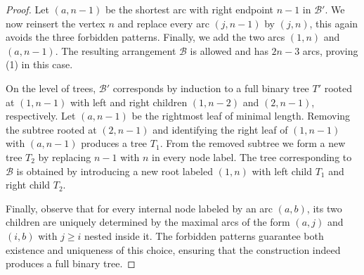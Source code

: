 \documentclass[12pt,a4paper]{amsart}
\theoremstyle{definition}
\begin{document}
\begin{proof}
Let \((a,n-1)\) be the shortest arc with right endpoint \(n-1\) in \(\mathcal B'\).
We now reinsert the vertex \(n\) and replace every arc \((j,n-1)\) by \((j,n)\), this again avoids the three forbidden patterns. Finally, we add the two arcs \((1,n)\) and \((a,n-1)\). The resulting arrangement \(\mathcal B\) is allowed and has
$2n-3$
arcs, proving (1) in this case.

On the level of trees, \(\mathcal B'\) corresponds by induction to a full binary tree \(T'\) rooted at \((1,n-1)\) with left and right children $(1,n-2)$ and $(2,n-1)$, respectively. Let \((a,n-1)\) be the rightmost leaf of minimal length. Removing the subtree rooted at \((2,n-1)\) and identifying the right leaf of  \((1,n-1)\) with \((a,n-1)\) produces a tree \(T_1\).  From the removed subtree we form a new tree \(T_2\) by replacing \(n-1\) with \(n\) in every node label. The tree corresponding to \(\mathcal B\) is obtained by introducing a new root labeled \((1,n)\) with left child \(T_1\) and right child \(T_2\).

Finally, observe that for every internal node labeled by an arc \((a,b)\), its two children are uniquely determined by the maximal arcs of the form \((a,j)\) and \((i,b)\)  with $j \geq i$ nested inside it. The forbidden patterns guarantee both existence and uniqueness of this choice, ensuring that the construction indeed produces a full binary tree.
\end{proof}    
\end{document}
